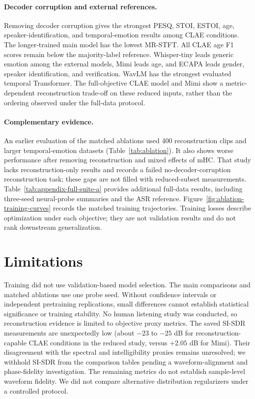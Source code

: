 \documentclass[11pt,a4paper]{article}
\begin{document}
\paragraph{Decoder corruption and external references.}
Removing decoder corruption gives the strongest PESQ, STOI, ESTOI, age, speaker-identification, and temporal-emotion results among CLAE conditions. The longer-trained main model has the lowest MR-STFT. All CLAE age F1 scores remain below the majority-label reference. Whisper-tiny leads generic emotion among the external models, Mimi leads age, and ECAPA leads gender, speaker identification, and verification. WavLM has the strongest evaluated temporal Transformer. The full-objective CLAE model and Mimi show a metric-dependent reconstruction trade-off on these reduced inputs, rather than the ordering observed under the full-data protocol.

\paragraph{Complementary evidence.}
An earlier evaluation of the matched ablations used 400 reconstruction clips and larger temporal-emotion datasets (Table~\ref{tab:ablation}). It also shows worse performance after removing reconstruction and mixed effects of mHC. That study lacks reconstruction-only results and records a failed no-decoder-corruption reconstruction task; these gaps are not filled with reduced-subset measurements. Table~\ref{tab:appendix-full-suite-a} provides additional full-data results, including three-seed neural-probe summaries and the ASR reference. Figure~\ref{fig:ablation-training-curves} records the matched training trajectories. Training losses describe optimization under each objective; they are not validation results and do not rank downstream generalization.

\section{Limitations}
\label{sec:limitations}

Training did not use validation-based model selection. The main comparisons and matched ablations use one probe seed. Without confidence intervals or independent pretraining replications, small differences cannot establish statistical significance or training stability. No human listening study was conducted, so reconstruction evidence is limited to objective proxy metrics. The saved SI-SDR measurements are unexpectedly low (about $-23$ to $-25$ dB for reconstruction-capable CLAE conditions in the reduced study, versus $+2.05$ dB for Mimi). Their disagreement with the spectral and intelligibility proxies remains unresolved; we withhold SI-SDR from the comparison tables pending a waveform-alignment and phase-fidelity investigation. The remaining metrics do not establish sample-level waveform fidelity. We did not compare alternative distribution regularizers under a controlled protocol.
\end{document}
